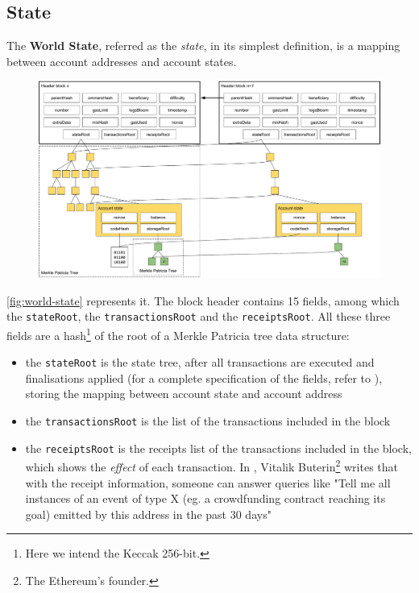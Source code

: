 \subsection{State}

The \textbf{World State}, referred as the \emph{state}, in its simplest
definition, is a mapping between account addresses and account states.

\begin{figure}[h]
  \centering
  \includegraphics[width=\textwidth]{./res/img/world-state.pdf}
\label{fig:world-state}
\end{figure}

\autoref{fig:world-state} represents it. The block header contains 15 fields,
among which the \verb+stateRoot+, the \verb+transactionsRoot+ and the
\verb+receiptsRoot+. All these three fields are a hash\footnote{Here we intend
the Keccak 256-bit.} of the root of a Merkle Patricia tree data structure:

\begin{itemize}
  \item the \verb+stateRoot+ is the state tree, after all transactions
  are executed and finalisations applied (for a complete specification of the
  fields, refer to \cite{wood2018ethereum}), storing the mapping between account
  state and account address
  \item the \verb+transactionsRoot+ is the list of the transactions included in
  the block
  \item the \verb+receiptsRoot+ is the receipts list of the transactions
  included in the block, which shows the \emph{effect} of each transaction. In
  \cite{merklingethereum}, Vitalik Buterin\footnote{The Ethereum's founder.}
  writes that with the receipt information, someone can answer queries like "Tell
  me all instances of an event of type X (eg. a crowdfunding contract reaching
  its goal) emitted by this address in the past 30 days"
\end{itemize}

